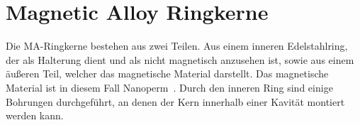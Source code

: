 \section{Magnetic Alloy Ringkerne}
Die MA-Ringkerne bestehen aus zwei Teilen. Aus einem inneren Edelstahlring, der als Halterung dient und als nicht magnetisch anzusehen ist, sowie aus einem \"au\ss{}eren Teil, welcher das magnetische Material darstellt. Das magnetische Material ist in diesem Fall Nanoperm~\citep{magnetec2018}. Durch den inneren Ring sind einige Bohrungen durchgef\"uhrt, an denen der Kern innerhalb einer Kavit\"at montiert werden kann.
